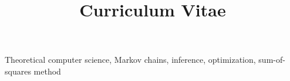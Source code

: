 \documentclass[a4paper,skipsamekey,11pt,english]{curve}
\title{Curriculum Vitae}
\begin{document}
\makeheaders[c]


\vspace{-2mm}
Theoretical computer science, Markov chains, inference, optimization, sum-of-squares method




\vspace{-4mm}


\vspace{-2mm}

\vspace{-2mm}



\vspace{-2mm}


\vspace{-2mm}

\vspace{-2mm}



% 
\end{document}
